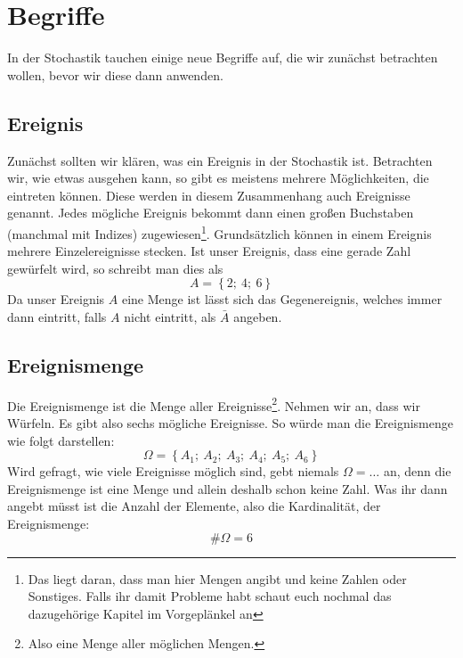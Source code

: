 \section{Begriffe}
In der Stochastik tauchen einige neue Begriffe auf, die wir zunächst betrachten wollen, bevor wir diese dann anwenden.

\subsection{Ereignis}
Zunächst sollten wir klären, was ein Ereignis in der Stochastik ist. Betrachten wir, wie etwas ausgehen kann, so gibt es meistens mehrere Möglichkeiten, die eintreten können. Diese werden in diesem Zusammenhang auch Ereignisse genannt. Jedes mögliche Ereignis bekommt dann einen großen Buchstaben (manchmal mit Indizes) zugewiesen\footnote{Das liegt daran, dass man hier Mengen angibt und keine Zahlen oder Sonstiges. Falls ihr damit Probleme habt schaut euch nochmal das dazugehörige Kapitel im Vorgeplänkel an}. Grundsätzlich können in einem Ereignis mehrere Einzelereignisse stecken. Ist unser Ereignis, dass eine gerade Zahl gewürfelt wird, so schreibt man dies als
\[A=\left\lbrace 2;\ 4;\ 6\right\rbrace \]
Da unser Ereignis $A$ eine Menge ist lässt sich das Gegenereignis, welches immer dann eintritt, falls $A$ nicht eintritt, als $\bar{A}$ angeben.

\subsection{Ereignismenge}
Die Ereignismenge ist die Menge aller Ereignisse\footnote{Also eine Menge aller möglichen Mengen.}. Nehmen wir an, dass wir Würfeln. Es gibt also sechs mögliche Ereignisse. So würde man die Ereignismenge wie folgt darstellen:
\[\Omega=\left\lbrace A_1;\ A_2;\ A_3;\ A_4;\ A_5;\ A_6\right\rbrace \]
Wird gefragt, wie viele Ereignisse möglich sind, gebt niemals \(\Omega=\ldots\) an, denn die Ereignismenge ist eine Menge und allein deshalb schon keine Zahl. Was ihr dann angebt müsst ist die Anzahl der Elemente, also die Kardinalität, der Ereignismenge:
\[\#\Omega=6\]

